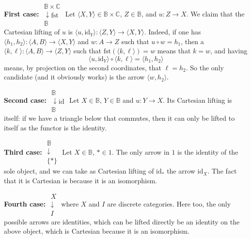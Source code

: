 \documentclass{report}
\newcommand{\bB}[0]{\mathbb B}
\newcommand{\bC}[0]{\mathbb C}
\newcommand{\fib}[3]{\begin{array}{l}#1 \\[-0.1cm] \downarrow #2 \\ #3\end{array}}
\newcommand{\idd}[0]{\mathrm{id}}
\begin{document}
\begin{answer}
    \textbf{First case:} $\fib{\bB\times\bC}{\mathrm{fst}}{\bB}$
    Let $\langle X,Y\rangle \in\bB\times \bC$, $Z \in\bB$, and $u : Z\to X$. We claim that the Cartesian
    lifting of $u$ is $\langle u,\idd_Y\rangle : \langle Z,Y\rangle \to \langle X,Y\rangle$. Indeed, if one
    has $\langle h_1,h_2\rangle : \langle A,B\rangle \to \langle X,Y\rangle$ and $w : A \to Z$ such that
    $u\circ w = h_1$, then a $\langle k,\ell\rangle : \langle A,B\rangle \to \langle Z,Y\rangle$ such that
    $\mathrm{fst}(\langle k,\ell\rangle) = w$ means that $k = w$, and having
    $$\langle u,\idd_Y\rangle \circ \langle k,\ell\rangle = \langle h_1,h_2\rangle$$
    means, by projection on the second coordinates, that $\ell = h_2$. So the only candidate (and it obviously
    works) is the arrow $\langle w,h_2\rangle$.
    \begin{center}
    \end{center}

    \textbf{Second case:} $\fib{\bB}{\idd}{\bB}$ Let $X \in \bB$, $Y \in \bB$ and $u : Y \to X$. Its Cartesian
    lifting is itself: if we have a triangle below that commutes, then it can only be lifted to itself as
    the functor is the identity.

    \textbf{Third case:} $\fib{\bB}{}{\{*\}}$ Let $X \in \bB$, $* \in 1$. The only arrow in $1$ is the
    identity of the sole object, and we can take as Cartesian lifting of $\idd_*$ the arrow $\idd_X$. The
    fact that it is Cartesian is because it is an isomorphism.

    \textbf{Fourth case:} $\fib{X}{}{I}$ where $X$ and $I$ are discrete categories. Here too, the only
    possible arrows are identities, which can be lifted directly be an identity on the above object, which
    is Cartesian because it is an isomorphism.
\end{answer}
\end{document}
